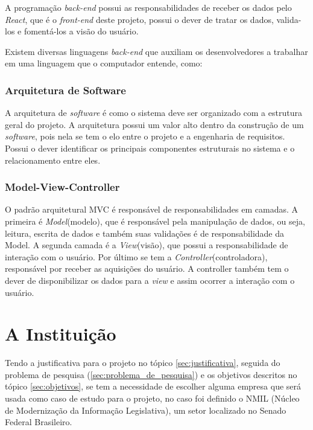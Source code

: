 A programação \textit{back-end} possui as responsabilidades de receber os dados pelo \textit{React}, que é o \textit{front-end} deste projeto, possui o dever de tratar os dados, valida-los e fomentá-los a visão do usuário.

Existem diversas linguagens \textit{back-end} que auxiliam os desenvolvedores a trabalhar em uma linguagem que o computador entende, como:


\subsubsection{Arquitetura de Software}

A arquitetura de \textit{software} é como o sistema deve ser organizado com a estrutura geral do projeto. A arquitetura possui um valor alto dentro da construção de um \textit{software}, pois nela se tem o elo entre o projeto e a engenharia de requisitos. Possui o dever identificar os principais componentes estruturais no sistema e o relacionamento entre eles.

\subsubsection{Model-View-Controller}
\label{sec:mvc}

O padrão arquitetural MVC é responsável de responsabilidades em camadas. A primeira é \textit{Model}(modelo), que é responsável pela manipulação de dados, ou seja, leitura, escrita de dados e também suas validações é de responsabilidade da Model. A segunda camada é a \textit{View}(visão), que possui a responsabilidade de interação com o usuário. Por último se tem a \textit{Controller}(controladora), responsável por receber as aquisições do usuário. A controller também tem o dever de disponibilizar os dados para a \textit{view} e assim ocorrer a interação com o usuário.

\section{A Instituição}

Tendo a justificativa para o projeto no tópico \ref{sec:justificativa}, seguida do problema de pesquisa (\ref{sec:problema_de_pesquisa}) e os objetivos descritos no tópico \ref{sec:objetivos}, se tem a necessidade de escolher alguma empresa que será usada como caso de estudo para o projeto, no caso foi definido o NMIL (Núcleo de Modernização da Informação Legislativa), um setor localizado no Senado Federal Brasileiro.

